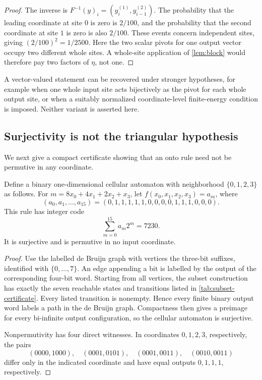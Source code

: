 \begin{proof}
The inverse is
$F^{-1}(y)_i=(y_i^{(1)},y_{i-1}^{(2)})$.  The probability that the leading
coordinate at site $0$ is zero is $2/100$, and the probability that the
second coordinate at site $1$ is zero is also $2/100$.  These events concern
independent sites, giving $(2/100)^2=1/2500$.  Here the two scalar pivots for
one output vector occupy two different whole sites.  A whole-site
application of \cref{lem:block} would therefore pay two factors of $\eta$,
not one.
\end{proof}

A vector-valued statement can be recovered under stronger hypotheses, for
example when one whole input site acts bijectively as the pivot for each
whole output site, or when a suitably normalized coordinate-level
finite-energy condition is imposed.  Neither variant is asserted here.

\subsection{Surjectivity is not the triangular hypothesis}

We next give a compact certificate showing that an onto rule need not be
permutive in any coordinate.

\begin{proposition}
\label{prop:surjective-firewall}
Define a binary one-dimensional cellular automaton with neighborhood
$\{0,1,2,3\}$ as follows.  For
$m=8x_0+4x_1+2x_2+x_3$, let
$f(x_0,x_1,x_2,x_3)=a_m$, where
\[
  (a_0,a_1,\ldots,a_{15})
  =(0,1,1,1,1,1,0,0,0,0,1,1,1,0,0,0).
\]
This rule has integer code
\[
  \sum_{m=0}^{15}a_m2^m=7230.
\]
It is surjective and is permutive in no input coordinate.
\end{proposition}

\begin{proof}
Use the labelled de Bruijn graph with vertices the three-bit suffixes,
identified with $\{0,\ldots,7\}$.  An edge appending a bit is labelled by the
output of the corresponding four-bit word.  Starting from all vertices, the
subset construction has exactly the seven reachable states and transitions
listed in \cref{tab:subset-certificate}.  Every listed transition is
nonempty.  Hence every finite binary output word labels a path in the de
Bruijn graph.  Compactness then gives a preimage for every bi-infinite output
configuration, so the cellular automaton is surjective.


\FloatBarrier

Nonpermutivity has four direct witnesses.  In coordinates $0,1,2,3$,
respectively, the pairs
\[
 (0000,1000),\quad(0001,0101),\quad
 (0001,0011),\quad(0010,0011)
\]
differ only in the indicated coordinate and have equal outputs
$0,1,1,1$, respectively.
\end{proof}


